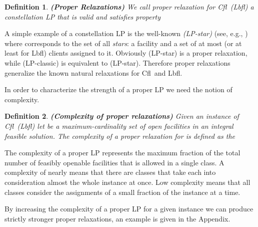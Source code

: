 \documentclass[11pt]{article}
\newtheorem{definition}{Definition}[section]
\newcommand{\lbfl}{{\sc Lbfl}}
\newcommand{\cfl}{{\sc Cfl}}
\begin{document}
\begin{definition}  {\bf (Proper Relaxations)}  \label{def:proper} 
We call {\em proper relaxation}  for \cfl\ (\lbfl\/)  a constellation LP
 that is valid and satisfies property  
\end{definition}
\vspace*{-0.1cm}


\noindent 
 A simple  example of a constellation LP is the well-known {\em
  (LP-star)}  (see, e.g., \cite{JainMMSV03}) where 
corresponds to the set of all  {\em stars}: 
a facility and a set of at most  (or at least  for \lbfl) clients assigned to
it.
Obviously (LP-star) is a proper relaxation, while (LP-classic) is equivalent to
(LP-star). Therefore proper relaxations generalize the known natural
relaxations for \cfl\ and \lbfl. 
\begin{comment}
Our  result on proper relaxations is that  proper LPs that  are not ``complex'' enough have an unbounded integrality gap while those  that
are sufficiently ``complex'' have an integrality gap of   To that end, we
define  the complexity  of  a  proper LP. 
\end{comment}
In order to  characterize the strength of a proper LP we need  the notion of
complexity.  
\iffalse
Furthermore, for each  such facility   we  denote by
 the  set of clients   for which  there is a facility   so
that  in .
\fi 

\vspace*{-0.2cm}
\begin{definition} {\bf (Complexity of proper relaxations)}  \label{def:complexity}
Given an instance  of \cfl\ (\lbfl\/)
let  be  a 
maximum-cardinality set  of open facilities in an integral feasible
solution. The {\em complexity } of a  proper
relaxation  for  is
defined as the 
   
\end{definition}

 \vspace*{-0.09cm}

The  complexity of  a  proper LP  represents the  maximum
fraction of the  total number of feasibly openable  facilities that is
allowed in a single class. 
A complexity of nearly 
means that there are classes that take each 
into consideration almost the whole instance
at once. Low complexity means that all classes consider
the assignments of a small fraction of the instance at a time.  
\iffalse ===========================
We remark
that    the   proper    LP    with   an    integral   polytope    from
Theorem~\ref{thm:gap1} has
a complexity of   since every class corresponds  by construction to
a feasible integral solution. 
(Clearly not every LP with complexity  has an integrality gap of 
since it might contain weak classes together with the strong
ones.) 
============ \fi 
By increasing the complexity of a proper LP  for a given instance 
 we can produce strictly stronger 
proper relaxations, an example is given in the Appendix. 
\end{document}
